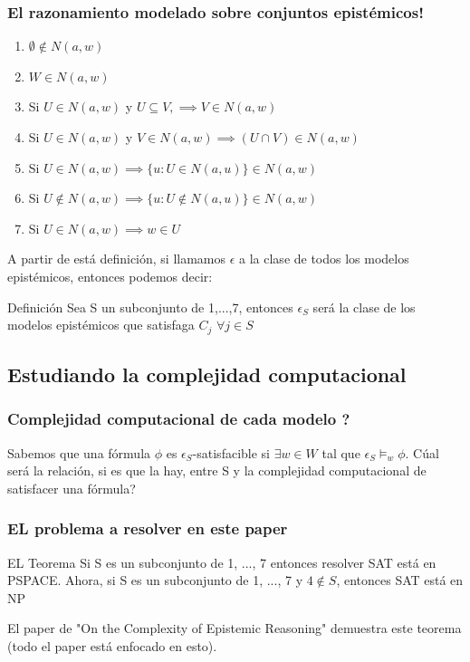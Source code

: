\documentclass{beamer}
\begin{document}
\begin{frame}
\frametitle{El razonamiento modelado sobre conjuntos epist\'emicos!}
\begin{enumerate}
\item $\emptyset \notin N(a,w)$
\item $W \in N(a,w)$
\item Si $U \in N(a,w)$ y $U \subseteq V, \implies V \in N(a,w)$
\item Si $U \in N(a,w)$ y $V \in N(a,w) \implies (U \cap V) \in N(a,w)$
\item Si $U \in N(a,w) \implies \{u : U \in N(a,u)\} \in N(a,w)$
\item Si $U \notin N(a,w) \implies \{u : U \notin N(a,u)\} \in N(a,w)$
\item Si $U \in N(a,w) \implies w \in U$
\end{enumerate}

A partir de est\'a definici\'on, si llamamos $\epsilon$ a la clase de todos los modelos epist\'emicos, entonces podemos decir:

\begin{block}{Definici\'on}
Sea S un subconjunto de {1,...,7}, entonces $\epsilon_{S}$ ser\'a la clase de los modelos epist\'emicos que satisfaga $C_{j}$ $\forall j \in S$
\end{block} 
\end{frame}

\subsection{Estudiando la complejidad computacional}

\begin{frame}
\frametitle{Complejidad computacional de cada modelo ?}

Sabemos que una f\'ormula $\phi$ es $\epsilon_{S}$-satisfacible si $\exists w \in W$ tal que $\epsilon_{S} \models_{w} \phi$. C\'ual ser\'a la relaci\'on, si es que la hay, entre S y la complejidad computacional de satisfacer una f\'ormula?
\end{frame}

\begin{frame}
\frametitle{EL problema a resolver en este paper}

\begin{block}{EL Teorema}
 Si S es un subconjunto de {1, ..., 7} entonces resolver SAT est\'a en PSPACE. Ahora, si S es un subconjunto de {1, ..., 7} y $4 \notin S$, entonces SAT est\'a en NP
\end{block}

El paper de "On the Complexity of Epistemic Reasoning" demuestra este teorema (todo el paper est\'a enfocado en esto).
\end{frame}
\end{document}
